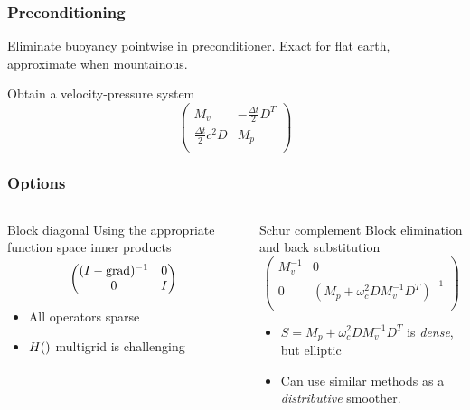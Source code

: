 \documentclass[presentation]{beamer}
\DeclareMathOperator{\grad}{grad}
\let\div\relax
\DeclareMathOperator{\div}{div}
\begin{document}
\begin{frame}
  \frametitle{Preconditioning}
  Eliminate buoyancy pointwise in preconditioner.  Exact for flat earth,
  approximate when mountainous.

  Obtain a velocity-pressure system
\begin{equation*}
\begin{pmatrix}
  M_v & -\frac{\Delta t}{2}D^T\\
  \frac{\Delta t}{2}c^2D & M_p\\
\end{pmatrix}
\end{equation*}

\end{frame}

\begin{frame}[t]
  \frametitle{Options}
  \begin{columns}
    \begin{column}{0.52\textwidth}
      \begin{block}{Block diagonal}
        Using the appropriate function space inner products \parencite{Mardal:2011,Kirby:2010}
        \begin{equation*}
          \begin{pmatrix}
            (I - \grad \div)^{-1} & 0 \\
            0 & I\\
          \end{pmatrix}
        \end{equation*}
      \end{block}
      \begin{itemize}
      \item All operators sparse
      \item $H(\div)$ multigrid \parencite{Arnold:2000} is challenging
      \end{itemize}
    \end{column}
    \begin{column}{0.52\textwidth}
      \begin{block}{Schur complement}
        Block elimination and back substitution
        \begin{equation*}
          \begin{pmatrix}
            M_v^{-1} & 0 \\
            0 & (M_p + \omega_c^2 D M_v^{-1} D^T)^{-1}\\
          \end{pmatrix}
        \end{equation*}
      \end{block}
      \begin{itemize}
      \item $S = M_p +  \omega_c^2 D M_v^{-1} D^T$ is \emph{dense}, but elliptic
      \item Can use similar methods as a \emph{distributive} smoother.
      \end{itemize}
    \end{column}
  \end{columns}
\end{frame}
\end{document}
